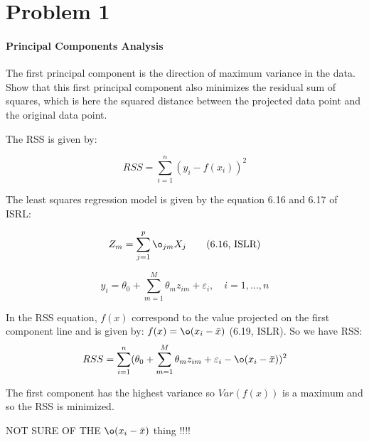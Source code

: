\section*{Problem 1}

\paragraph{Principal Components Analysis}
The first principal component is the direction of maximum variance in the data. Show that this first principal component also minimizes the residual sum of squares, which is here the squared distance between the projected data point and the original data point.

The RSS is given by: 

\[ RSS = \sum_{i = 1}^{n}(y_i - f(x_i))^2 \]

The least squares regression model is given by the equation 6.16 and 6.17 of ISRL: 

\[ 
	Z_m = \sum_{j = 1}^{p}\o_{jm} X_j \tag{6.16, ISLR} \label{6.16}
 \]

\[ 
	y_i = \theta_0 + \sum_{m = 1}^{M} \theta_m z_{im} + \varepsilon_i,\quad i = 1,...,n \tag{6.17, ISLR} \label{6.17} 
\]

In the RSS equation, $f(x)$ correspond to the value projected on the first component line and is given by: $f(x) = \o(x_i - \bar{x})$ (6.19, ISLR). 
So we have RSS:  
\[ 
	RSS = \sum_{i = 1}^{n}(\theta_0 + \sum_{m = 1}^{M} \theta_m z_{im} + \varepsilon_i - \o(x_i - \bar{x}))^2
 \]
 
 
 The first component has the highest variance so $Var(f(x))$ is a maximum and so the RSS is minimized. 
 
 NOT SURE OF THE $\o(x_i - \bar{x})$ thing !!!!